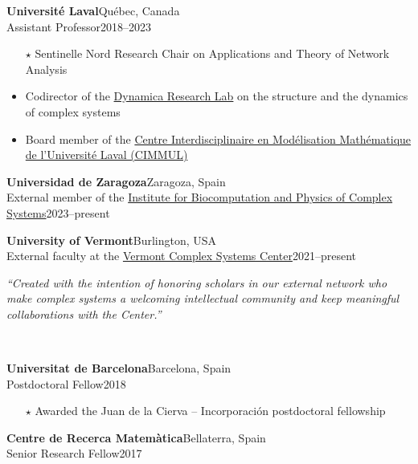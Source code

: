 \documentclass[11pt]{article}
\begin{document}
%
\parbox[t]{\textwidth}{%
\textbf{Universit\'e Laval}\hfill Qu\'ebec, Canada\\
Assistant Professor\hfill 2018--2023
\begin{itemize}[leftmargin=1.5em]\small
  \item[$\star$] Sentinelle Nord Research Chair on Applications and Theory of Network Analysis
  \item Codirector of the \href{http://dynamica.phy.ulaval.ca}{Dynamica Research Lab} on the structure and the dynamics of complex systems
  \item Board member of the \href{http://cimmul.fsg.ulaval.ca}{Centre Interdisciplinaire en Modélisation Mathématique de l’Université Laval (CIMMUL)}
\end{itemize}}
%
\parbox[t]{\textwidth}{%
\textbf{Universidad de Zaragoza}\hfill Zaragoza, Spain\\
External member of the \href{https://bifi.es}{Institute for Biocomputation and Physics of Complex Systems}\hfill 2023--present%
\vspace{0.25\baselineskip}\\}
%
\parbox[t]{\textwidth}{%
\textbf{University of Vermont}\hfill Burlington, USA\\
External faculty at the \href{https://vermontcomplexsystems.org}{Vermont Complex Systems Center}\hfill 2021--present%
\vspace{0.25\baselineskip}\\\hspace*{1.5em}%
\begin{minipage}{0.75\textwidth}
  \small\textit{``Created with the intention of honoring scholars in our external network who make complex systems a welcoming intellectual community and keep meaningful collaborations with the Center.''}
\end{minipage}
\vspace{0.75\baselineskip}\\}
%
\parbox[t]{\textwidth}{%
\textbf{Universitat de Barcelona}\hfill Barcelona, Spain\\
Postdoctoral Fellow\hfill 2018
\begin{itemize}[leftmargin=1.5em]\small
  \item[$\star$] Awarded the Juan de la Cierva -- Incorporaci\'on postdoctoral fellowship
\end{itemize}}
%
\parbox[t]{\textwidth}{%
\textbf{Centre de Recerca Matem\`atica}\hfill Bellaterra, Spain\\
Senior Research Fellow\hfill 2017%
\vspace{0.25\baselineskip}\\}
\end{document}
